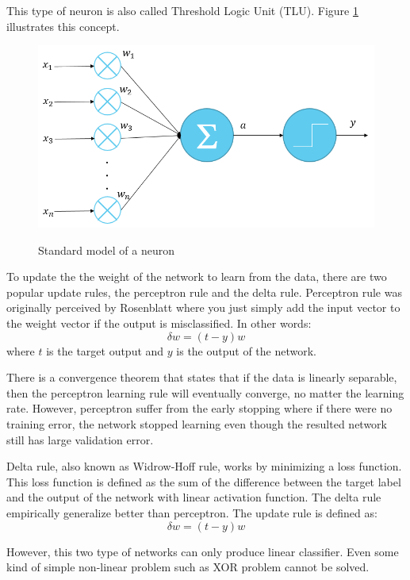 \documentclass[a4paper,11pt]{kth-mag}
\begin{document}
This type of neuron is also called Threshold Logic Unit (TLU). Figure \ref{fig:neuron} illustrates this concept.

\begin{figure}
\centering
\includegraphics[scale=0.5]{image/neuron.png}
\label{fig:neuron}
\caption{Standard model of a neuron}
\end{figure}

To update the the weight of the network to learn from the data, there are two popular update rules, the perceptron rule and the delta rule. Perceptron rule was originally perceived by Rosenblatt \cite{rosenblatt1957} where you just simply add the input vector to the weight vector if the output is misclassified. In other words:
\begin{equation}
\delta w = (t-y) w
\end{equation}
where $t$ is the target output and $y$ is the output of the network.

There is a convergence theorem that states that if the data is linearly separable, then the perceptron learning rule will eventually converge, no matter the learning rate. However, perceptron suffer from the early stopping where if there were no training error, the network stopped learning even though the resulted network still has large validation error.

Delta rule, also known as Widrow-Hoff rule, works by minimizing a loss function. This loss function is defined as the sum of the difference between the target label and the output of the network with linear activation function. The delta rule empirically generalize better than perceptron. The update rule is defined as:
\begin{equation}
\delta w = (t-y) w
\end{equation}

However, this two type of networks can only produce linear classifier. Even some kind of simple non-linear problem such as XOR problem cannot be solved.
\end{document}
